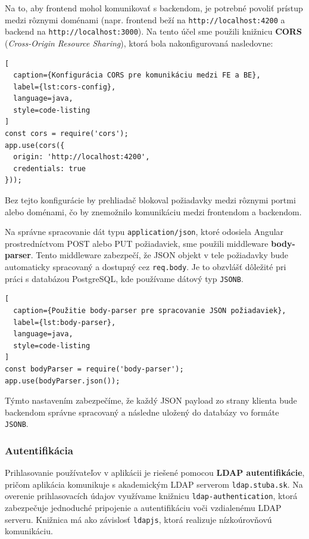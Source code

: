 \bigskip
Na to, aby frontend mohol komunikovať s backendom, je potrebné povoliť prístup medzi rôznymi doménami (napr. frontend beží na \texttt{http://localhost:4200} a backend na \texttt{http://localhost:3000}). Na tento účel sme použili knižnicu \textbf{CORS} (\textit{Cross-Origin Resource Sharing}), ktorá bola nakonfigurovaná nasledovne:

\begin{lstlisting}[
  caption={Konfigurácia CORS pre komunikáciu medzi FE a BE},
  label={lst:cors-config},
  language=java,
  style=code-listing
]
const cors = require('cors');
app.use(cors({
  origin: 'http://localhost:4200',
  credentials: true
}));
\end{lstlisting}

Bez tejto konfigurácie by prehliadač blokoval požiadavky medzi rôznymi portmi alebo doménami, čo by znemožnilo komunikáciu medzi frontendom a backendom.

\bigskip
Na správne spracovanie dát typu \texttt{application/json}, ktoré odosiela Angular prostredníctvom POST alebo PUT požiadaviek, sme použili middleware \textbf{body-parser}. Tento middleware zabezpečí, že JSON objekt v tele požiadavky bude automaticky spracovaný a dostupný cez \texttt{req.body}. Je to obzvlášť dôležité pri práci s databázou PostgreSQL, kde používame dátový typ \texttt{JSONB}.

\begin{lstlisting}[
  caption={Použitie body-parser pre spracovanie JSON požiadaviek},
  label={lst:body-parser},
  language=java,
  style=code-listing
]
const bodyParser = require('body-parser');
app.use(bodyParser.json());
\end{lstlisting}

Týmto nastavením zabezpečíme, že každý JSON payload zo strany klienta bude backendom správne spracovaný a následne uložený do databázy vo formáte \texttt{JSONB}.


 \subsubsection{Autentifikácia}

 Prihlasovanie používateľov v aplikácii je riešené pomocou \textbf{LDAP autentifikácie}, pričom aplikácia komunikuje s akademickým LDAP serverom \texttt{ldap.stuba.sk}. Na overenie prihlasovacích údajov využívame knižnicu \texttt{ldap-authentication}, ktorá zabezpečuje jednoduché pripojenie a autentifikáciu voči vzdialenému LDAP serveru. Knižnica má ako závislosť \texttt{ldapjs}, ktorá realizuje nízkoúrovňovú komunikáciu.
 
